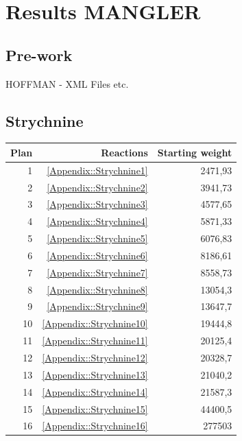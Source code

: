 \documentclass[a4paper,10pt,titlepage]{paper}
\begin{document}
\section{Results MANGLER}
\subsection{Pre-work}
HOFFMAN - XML Files etc.
\subsection{Strychnine}
\begin{table}[H]
\centering
\begin{tabular}{|r|r|r|}
\hline
Plan & Reactions & Starting weight \\ \hline
1 & \ref{Appendix::Strychnine1} & 2471,93 \\\hline
2 & \ref{Appendix::Strychnine2} & 3941,73 \\\hline
3 & \ref{Appendix::Strychnine3} & 4577,65 \\\hline
4 & \ref{Appendix::Strychnine4} & 5871,33 \\\hline
5 & \ref{Appendix::Strychnine5} & 6076,83 \\\hline
6 & \ref{Appendix::Strychnine6} & 8186,61 \\\hline
7 & \ref{Appendix::Strychnine7} & 8558,73 \\\hline
8 & \ref{Appendix::Strychnine8} & 13054,3 \\\hline
9 & \ref{Appendix::Strychnine9} & 13647,7 \\\hline
10 & \ref{Appendix::Strychnine10} & 19444,8 \\\hline
11 & \ref{Appendix::Strychnine11} & 20125,4 \\\hline
12 & \ref{Appendix::Strychnine12} & 20328,7 \\\hline
13 & \ref{Appendix::Strychnine13} & 21040,2 \\\hline
14 & \ref{Appendix::Strychnine14} & 21587,3 \\\hline
15 & \ref{Appendix::Strychnine15} & 44400,5 \\\hline
16 & \ref{Appendix::Strychnine16} & 277503 \\\hline

\end{tabular}
\end{table}
\end{document}

